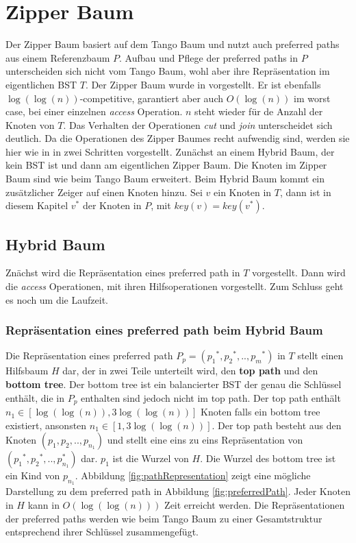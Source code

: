 \documentclass[a4paper,12pt]{article}
\begin{document}
\section {Zipper Baum}
Der Zipper Baum basiert auf dem Tango Baum und nutzt auch preferred paths aus einem Referenzbaum $P$. Aufbau und Pflege der preferred paths in $P$ unterscheiden sich nicht vom Tango Baum, wohl aber ihre Repräsentation im eigentlichen BST $T$. Der Zipper Baum wurde in \cite{zipper} vorgestellt. Er ist ebenfalls $\log\left(\log\left(n\right)\right)$-competitive,  garantiert aber auch  $O\left(\log \left(n\right)\right)$ im worst case, bei einer einzelnen \textit{access} Operation. $n$ steht wieder für de Anzahl der Knoten von $T$. Das Verhalten der Operationen \textit{cut} und \textit{join} unterscheidet sich deutlich. Da die Operationen des Zipper Baumes recht aufwendig sind, werden sie hier wie in \cite{zipper} in zwei Schritten vorgestellt. Zunächst an einem Hybrid Baum, der kein  BST ist und dann am eigentlichen Zipper Baum. Die Knoten im Zipper Baum sind wie beim Tango Baum erweitert. Beim Hybrid Baum kommt ein zusätzlicher Zeiger auf einen Knoten hinzu.  Sei $v$ ein Knoten in $T$, dann ist in diesem Kapitel $v^*$ der Knoten in $P$, mit $\mathit{key}\left(v\right) = \mathit{key}\left(v^*\right)$.

\subsection{Hybrid Baum}
Znächst wird die Repräsentation eines preferred path in $T$ vorgestellt. Dann wird die \textit{access} Operationen, mit ihren Hilfsoperationen vorgestellt. Zum Schluss geht es noch um die Laufzeit. 


\subsubsection{Repräsentation eines preferred path beim Hybrid Baum} 
Die Repräsentation eines preferred path  $P_p = \left({p_1}^*,{p_2}^*,..,{p_m}^*\right)$ in $T$ stellt einen Hilfsbaum $H$ dar, der in zwei Teile unterteilt wird, den  \textbf{top path} und den \textbf{bottom tree}. Der bottom tree ist ein balancierter BST der genau die Schlüssel enthält, die in $P_p$ enthalten sind jedoch nicht im top path.  Der top path enthält $n_1 \in \left[\log\left(\log\left(n\right)\right), 3 \log\left(\log\left(n\right)\right) \right]$ Knoten falls ein bottom tree existiert, ansonsten  $n_1 \in \left[1, 3 \log\left(\log\left(n\right)\right) \right]$. Der top path besteht aus den Knoten $\left({p_1},{p_2},..,{p_{n_1}}\right)$ und stellt eine eins zu eins Repräsentation von $ \left({p_1}^*,{p_2}^*,..,p_{n_1}^*\right)$ dar. ${p_1}$ ist die Wurzel von $H$. Die Wurzel des bottom tree ist ein Kind von ${p_{n_1}}$. Abbildung \ref{fig:pathRepresentation} zeigt eine mögliche Darstellung zu dem preferred path in Abbildung \ref{fig:preferredPath}. Jeder Knoten in $H$ kann in $O\left(\log\left(\log \left(n\right)\right)\right)$ Zeit erreicht werden. Die Repräsentationen der preferred paths werden wie beim Tango Baum zu einer Gesamtstruktur entsprechend ihrer Schlüssel zusammengefügt. 
\end{document}

